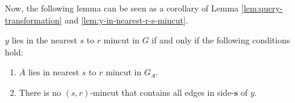 Now, the following lemma can be seen as a corollary of Lemma \ref{lem:query-transformation} and \ref{lem:y-in-nearest-r-s-mincut}.

\begin{corollary}

\label{cor:y-lies-in-nearest-r-s-mincut}

$y$ lies in the nearest $s$ to $r$ mincut in $G$ if and only if the following conditions hold:

\begin{enumerate}
    \item ${\overline A}$ lies in nearest $s$ to $r$ mincut in $G_A$.
    \item There is no $(s,r)$-mincut that contains all edges in side-$\mathbf{s}$ of $y$.
\end{enumerate}
\end{corollary}